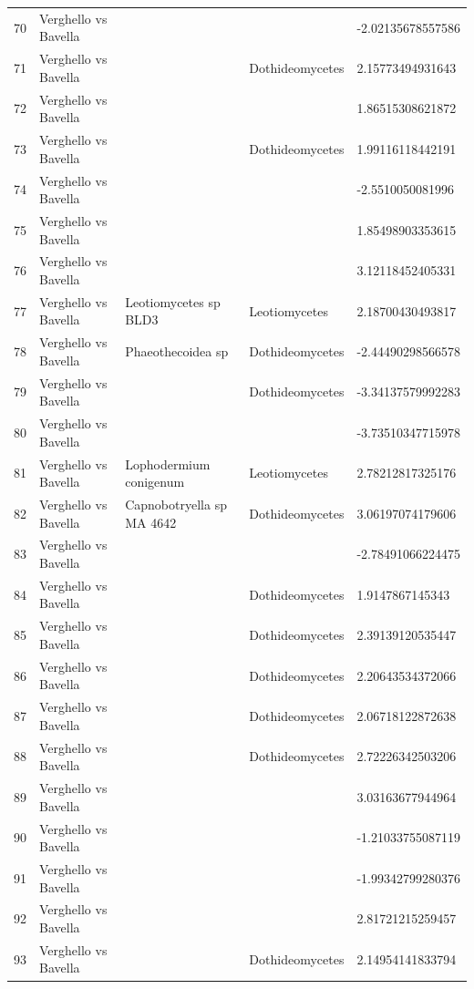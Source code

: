 \documentclass[12pt]{article}\usepackage[]{graphicx}\usepackage[]{color}
\numberwithin{figure}{section}
\begin{document}
\begin{table}[ht]
\begin{tabular}{lllll}
  70 & Verghello vs Bavella &  &  & -2.02135678557586 \\ 
  71 & Verghello vs Bavella &  & Dothideomycetes & 2.15773494931643 \\ 
  72 & Verghello vs Bavella &  &  & 1.86515308621872 \\ 
  73 & Verghello vs Bavella &  & Dothideomycetes & 1.99116118442191 \\ 
  74 & Verghello vs Bavella &  &  & -2.5510050081996 \\ 
  75 & Verghello vs Bavella &  &  & 1.85498903353615 \\ 
  76 & Verghello vs Bavella &  &  & 3.12118452405331 \\ 
  77 & Verghello vs Bavella & Leotiomycetes sp BLD3 & Leotiomycetes & 2.18700430493817 \\ 
  78 & Verghello vs Bavella & Phaeothecoidea sp & Dothideomycetes & -2.44490298566578 \\ 
  79 & Verghello vs Bavella &  & Dothideomycetes & -3.34137579992283 \\ 
  80 & Verghello vs Bavella &  &  & -3.73510347715978 \\ 
  81 & Verghello vs Bavella & Lophodermium conigenum & Leotiomycetes & 2.78212817325176 \\ 
  82 & Verghello vs Bavella & Capnobotryella sp MA 4642 & Dothideomycetes & 3.06197074179606 \\ 
  83 & Verghello vs Bavella &  &  & -2.78491066224475 \\ 
  84 & Verghello vs Bavella &  & Dothideomycetes & 1.9147867145343 \\ 
  85 & Verghello vs Bavella &  & Dothideomycetes & 2.39139120535447 \\ 
  86 & Verghello vs Bavella &  & Dothideomycetes & 2.20643534372066 \\ 
  87 & Verghello vs Bavella &  & Dothideomycetes & 2.06718122872638 \\ 
  88 & Verghello vs Bavella &  & Dothideomycetes & 2.72226342503206 \\ 
  89 & Verghello vs Bavella &  &  & 3.03163677944964 \\ 
  90 & Verghello vs Bavella &  &  & -1.21033755087119 \\ 
  91 & Verghello vs Bavella &  &  & -1.99342799280376 \\ 
  92 & Verghello vs Bavella &  &  & 2.81721215259457 \\ 
  93 & Verghello vs Bavella &  & Dothideomycetes & 2.14954141833794 \\ 

\end{tabular}
\end{table}
\end{document}
